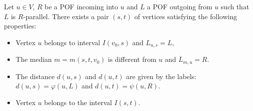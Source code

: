 \documentclass[a4paper,UKenglish,numberwithinsect,cleveref, autoref]{lipics-v2021}
\begin{document}
\begin{theorem}
Let $u \in V$, $R$ be a POF incoming into $u$ and $L$ a POF outgoing from $u$ such that $L$ is $R$-parallel. There exists a pair $(s,t)$ of vertices satisfying the following properties:
\begin{itemize}
    \item Vertex $u$ belongs to interval $I(v_0,s)$ and $L_{u,s} = L$,
    \item The median $m = m(s,t,v_0)$ is different from $u$ and $\overline{L}_{m,u} = R$.
    \item The distance $d(u,s)$ and $d(u,t)$ are given by the labels: $d(u,s) = \varphi(u,L)$ and $d(u,t) = \psi(u,R)$.
    \item Vertex $u$ belongs to the interval $I(s,t)$.
\end{itemize}
\label{th:psi_plus_phi}
\end{theorem}
\end{document}
